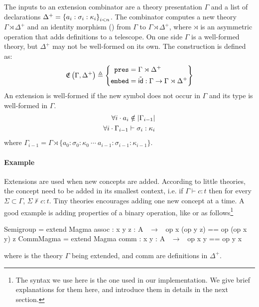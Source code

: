 The inputs to an extension combinator are a theory presentation $\Gamma$ and a list of declarations $\Delta^+ = \left\{a_{i}:\sigma_{i}:\kappa_{i}\right\}_{i<n}$. 
The combinator computes a new theory $\Gamma\rtimes\Delta^+$ and an identity morphism () from $\Gamma$ to $\Gamma\rtimes\Delta^+$, where $\rtimes$ is an asymmetric operation that adds definitions to a telescope. On one side $\Gamma$ is a well-formed theory, but $\Delta^+$ may not be well-formed on its own. 
The construction is defined as: 
\[\mathfrak{E}\left(\Gamma, \Delta^+\right) \triangleq \left\{ \begin{aligned} \mathtt{pres} & = \Gamma \rtimes \Delta^+ \\ \mathtt{embed} & = \tilde{\mathsf{id}} : \Gamma \rightarrow \Gamma \rtimes \Delta^+ \end{aligned}\right\}\]
An extension is well-formed if the new symbol does not occur in $\Gamma$ and its type is well-formed in $\Gamma$. 
\begin{eqnarray}
\forall i \cdot a_i \notin | \Gamma_{i-1} | \\
\forall i \cdot \Gamma_{i-1} \vdash \sigma_i : \kappa_{i}
\end{eqnarray}
where $\Gamma_{i-1} = \Gamma \rtimes \{a_0 : \sigma_0 : \kappa_0\  \cdots \ a_{i-1} : \sigma_{i-1} : \kappa_{i-1}\}$.  


\paragraph{Example}
Extensions are used when new concepts are added. According to little theories, the concept need to be added in its smallest context, i.e. if $\Gamma \vdash c : t$ then for every $\Sigma \subset \Gamma$, $\Sigma \nvdash c : t$. Tiny theories encourages adding one new concept at a time. A good example is adding properties of a binary operation, like  or  as follows\footnote{The syntax we use here is the one used in our implementation. We give brief explanations for them here, and introduce them in details in the next section.} 
\begin{togcode}
Semigroup = 
  extend Magma {assoc : {x y z : A} ~$\to$~ op x (op y z) == op (op x y) z} 
CommMagma = 
  extend Magma {comm  : {x y : A} ~$\to$~ op x y == op y x}
\end{togcode} 
\noindent where  is the theory $\Gamma$ being extended,  and {comm} are definitions in $\Delta^+$. 


